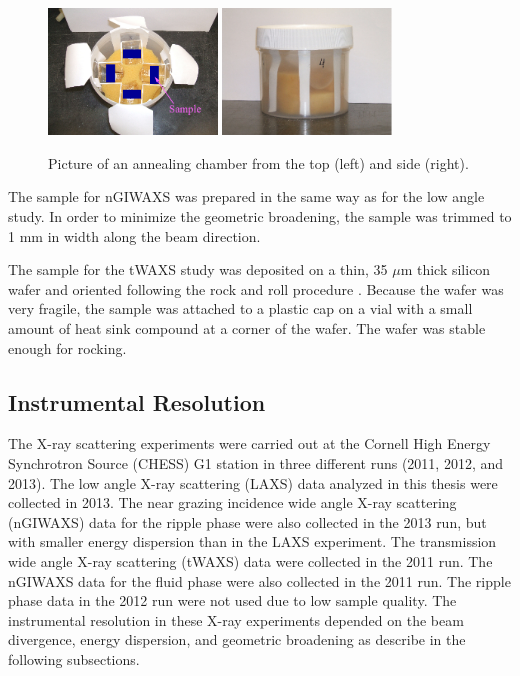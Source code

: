\begin{figure}[htbp]
  \centering
  \includegraphics[width=0.4\textwidth]{figures/ripple/MMs/annealing_chamber_topview}
  \quad
  \includegraphics[width=0.4\textwidth]{figures/ripple/MMs/annealing_chamber_sideview}  
  \caption[Picture of an annealing chamber
  from the top (left) and side (right)]
  {Picture of an annealing chamber
  from the top (left) and side (right).}
  \label{fig:annealing_chamber}
\end{figure}

The sample for nGIWAXS was prepared in the same way 
as for the low angle study. In order to minimize the geometric broadening, the 
sample was trimmed to 1 mm in width along the beam direction.

The sample for the tWAXS study was deposited on a thin, 35 $\mu$m thick silicon
wafer and oriented following the rock and roll procedure \cite{Tristram-Nagle07_MMB}.  
Because the wafer was very fragile, 
the sample was attached to a plastic cap on 
a vial with a small amount of heat sink compound at a corner of the 
wafer. The wafer was stable enough for rocking. 

\subsection{Instrumental Resolution}\label{sec:instrumental_resolution}
The X-ray scattering experiments were carried out at the Cornell 
High Energy Synchrotron Source (CHESS) G1 station in three different runs
(2011, 2012, and 2013). 
The low angle X-ray scattering (LAXS) data analyzed 
in this thesis were collected in 2013.
The near grazing incidence wide angle X-ray scattering (nGIWAXS) data
for the ripple phase were also collected
in the 2013 run, but with smaller energy dispersion than in the LAXS experiment.
The transmission wide angle X-ray scattering (tWAXS) data were collected
in the 2011 run. The nGIWAXS data for the fluid phase were also collected in
the 2011 run.
The ripple phase data in the 2012 run were not used
due to low sample quality.
The instrumental resolution in these X-ray experiments depended on the beam
divergence, energy dispersion, and geometric broadening 
as describe in the following subsections.

